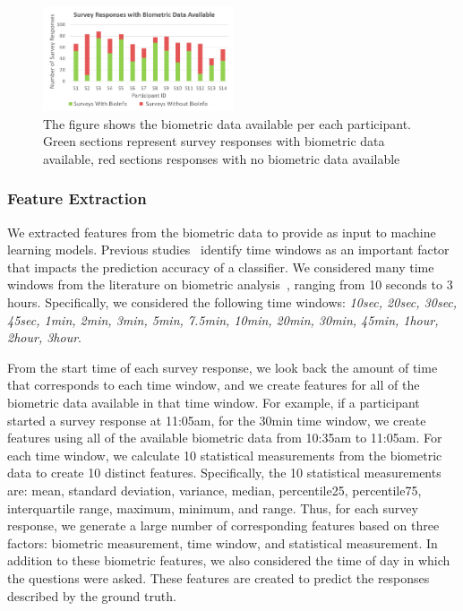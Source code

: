 \begin{figure}
  \centering
      \includegraphics[width=0.5\textwidth]{DuringTheDay.png}
  \caption{The figure shows the biometric data available per each participant. Green sections represent survey responses with biometric
  data available, red sections responses with no biometric data available}
   \label{surveyBio}
   \vspace*{-4mm}
\end{figure}


\subsubsection{Feature Extraction}
We extracted features from the biometric data to provide as input to machine 
learning models. Previous 
studies~ \cite{vorburger05,zuger2015interruptibility} identify time windows as an 
important factor that impacts the prediction accuracy of a classifier. We 
considered many time windows from the literature on biometric 
analysis~\cite{zuger18}, ranging from 10 seconds to 3 hours. Specifically, we 
considered the following time windows: \textit{10sec, 20sec, 30sec, 45sec, 
1min, 2min, 3min, 5min, 7.5min, 10min, 20min, 30min, 45min, 1hour, 2hour, 
3hour}.

From the start time of each survey response, we look back the amount of time 
that corresponds to each time window, and we create features for all of the 
biometric data available in that time window. For example, if a participant 
started a survey response at 11:05am, for the 30min time window, we create 
features using all of the available biometric data from 10:35am to 11:05am. 
For each time window, we calculate 10 statistical measurements from the 
biometric data to create 10 distinct features. Specifically, the 10 
statistical measurements are: mean, standard deviation, variance, median, 
percentile25, percentile75, interquartile range, maximum, minimum, and 
range. Thus, for each survey response, we generate a large number of 
corresponding features based on three factors: biometric measurement, time 
window, and statistical measurement. In addition to these biometric 
features, we also considered the time of day in which the questions were 
asked. These features are created to predict the responses described by the 
ground truth.

